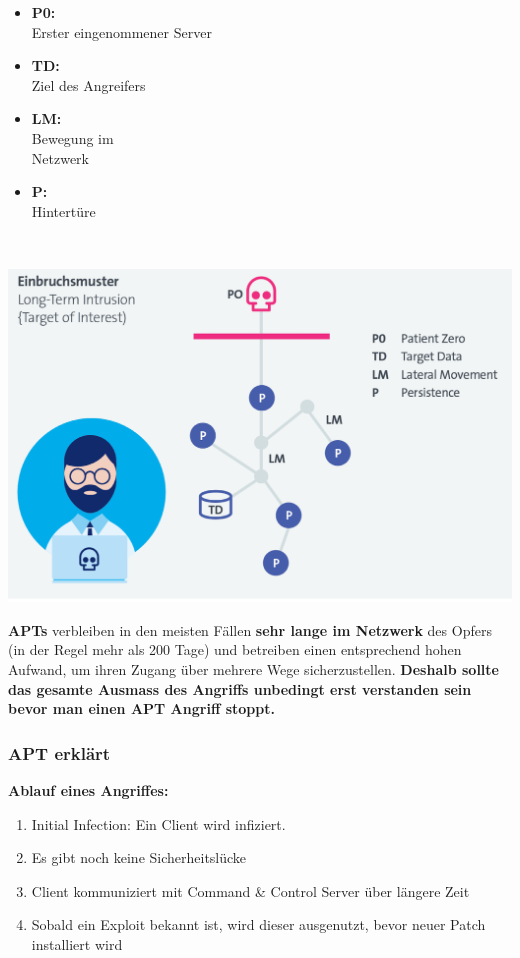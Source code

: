 \begin{minipage}{0.3\linewidth}
    \begin{itemize}
        \item \textbf{P0:}\\ Erster eingenommener Server
        \item \textbf{TD:}\\ Ziel des Angreifers
        \item \textbf{LM:}\\ Bewegung im\\ Netzwerk
        \item \textbf{P:}\\ Hintertüre
    \end{itemize}
    \vfill
    $ $
\end{minipage}
\begin{minipage}{0.7\linewidth}
    \begin{center}
        \includegraphics[width=\linewidth]{./img/01-cyber_defense/apt}
    \end{center}
\end{minipage}


\textbf{APTs} verbleiben in den meisten Fällen \textbf{sehr lange im Netzwerk} des Opfers (in der Regel mehr als 200 Tage) und betreiben einen entsprechend hohen Aufwand, um ihren Zugang über mehrere Wege sicherzustellen.
\textbf{Deshalb sollte das gesamte Ausmass des Angriffs unbedingt erst verstanden sein bevor man einen APT Angriff stoppt.}


\subsubsection{APT erklärt}
\textbf{Ablauf eines Angriffes:}
\begin{enumerate}
    \item Initial Infection: Ein Client wird infiziert.
    \item Es gibt noch keine Sicherheitslücke
    \item Client kommuniziert mit Command \& Control Server über längere Zeit
    \item Sobald ein Exploit bekannt ist, wird dieser ausgenutzt, bevor neuer Patch installiert wird
\end{enumerate}

